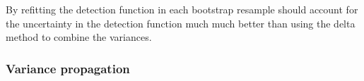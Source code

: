 \documentclass[a4paper,12pt]{article}
\begin{document}
By refitting the detection function in each bootstrap resample should account for the uncertainty in the detection function much much better than using the delta method to combine the variances.

\subsubsection*{Variance propagation}

\end{document}
